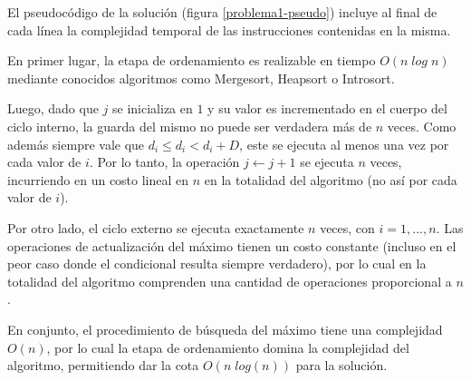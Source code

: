 El pseudocódigo de la solución (figura \ref{problema1-pseudo}) incluye al final de cada línea la complejidad temporal de las instrucciones contenidas en la misma.

En primer lugar, la etapa de ordenamiento es realizable en tiempo $O(n\;log\;n)$ mediante conocidos algoritmos como Mergesort, Heapsort o Introsort.

Luego, dado que $j$ se inicializa en $1$ y su valor es incrementado en el cuerpo del ciclo interno, la guarda del mismo no puede ser verdadera más de $n$ veces. Como además siempre vale que $d_i \leq d_i < d_i + D$, este se ejecuta al menos una vez por cada valor de $i$. Por lo tanto, la operación $j \leftarrow j + 1$ se ejecuta $n$ veces, incurriendo en un costo lineal en $n$ en la totalidad del algoritmo (no así por cada valor de $i$).

Por otro lado, el ciclo externo se ejecuta exactamente $n$ veces, con $i = 1, ..., n$. Las operaciones de actualización del máximo tienen un costo constante (incluso en el peor caso donde el condicional resulta siempre verdadero), por lo cual en la totalidad del algoritmo comprenden una cantidad de operaciones proporcional a $n$.

En conjunto, el procedimiento de búsqueda del máximo tiene una complejidad $O(n)$, por lo cual la etapa de ordenamiento domina la complejidad del algoritmo, permitiendo dar la cota $O(n\;log(n))$ para la solución.







